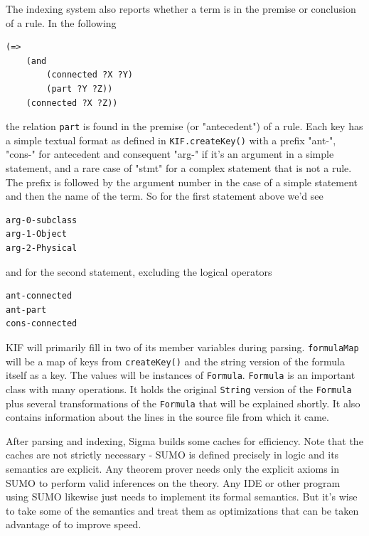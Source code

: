 \documentclass{book}
\begin{document}
The indexing system also reports whether a term is in the premise or conclusion of
a rule.  In the following

\begin{lstlisting}[basicstyle=\ttfamily\small\bfseries]
(=>
    (and
        (connected ?X ?Y)
        (part ?Y ?Z))
    (connected ?X ?Z))
\end{lstlisting}

the relation \texttt{part} is found in the premise (or "antecedent") of a rule. Each key
has a simple textual format as defined in \texttt{KIF.createKey()} with a prefix
"ant-", "cons-" for antecedent and consequent "arg-" if it's an argument in a simple
statement, and a rare case of "stmt" for a complex statement that is not a rule.
The prefix is followed by the argument number in the case of a simple statement and
then the name of the term.  So for the first statement above we'd see

\begin{lstlisting}[basicstyle=\ttfamily\small\bfseries]
arg-0-subclass 
arg-1-Object 
arg-2-Physical
\end{lstlisting}

and for the second statement, excluding the logical operators

\begin{lstlisting}[basicstyle=\ttfamily\small\bfseries]
ant-connected
ant-part
cons-connected
\end{lstlisting}

KIF will primarily fill in two of its member variables during parsing.  \texttt{formulaMap}
will be a map of keys from \texttt{createKey()} and the string version of the formula itself
as a key.  The values will be instances of \texttt{Formula}.  \texttt{Formula} is an important
class with many operations.  It holds the original \texttt{String} version of the \texttt{Formula}
plus several transformations of the \texttt{Formula} that will be explained shortly.  It also
contains information about the lines in the source file from which it came.

After parsing and indexing, Sigma builds some caches for efficiency.  Note that
the caches are not strictly necessary - SUMO is defined precisely in logic and its
semantics are explicit.  Any theorem prover needs only the explicit axioms in SUMO
to perform valid inferences on the theory.  Any IDE or other program using SUMO likewise
just needs to implement its formal semantics.  But it's wise to take some of the semantics and
treat them as optimizations that can be taken advantage of to improve speed.
\end{document}
